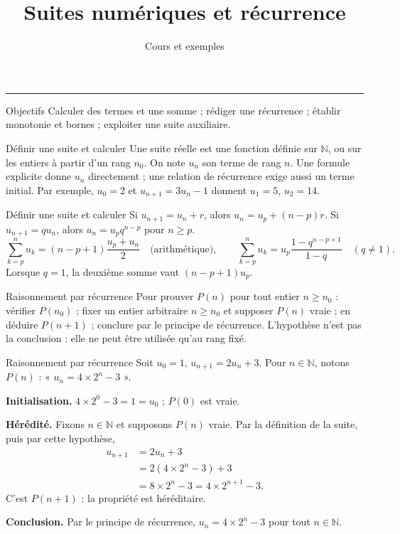 \documentclass[aspectratio=169,10pt]{beamer}
\title{Suites numériques et récurrence}
\subtitle{Cours et exemples}
\date{}
\author{}
\providecommand{\N}{\mathbb{N}}
\begin{document}
\begin{frame}[plain]
\vfill
{\inserttitle\par}
\medskip
{\insertsubtitle\par}
\medskip
{\rule{\textwidth}{.5pt}}
\vfill
\end{frame}
\begin{frame}{Objectifs}
Calculer des termes et une somme ; rédiger une récurrence ; établir monotonie et bornes ; exploiter une suite auxiliaire.
\end{frame}
\begin{frame}{Définir une suite et calculer}
Une suite réelle est une fonction définie sur \(\N\), ou sur les entiers à partir d'un rang \(n_0\). On note \(u_n\) son terme de rang \(n\). Une formule explicite donne \(u_n\) directement ; une relation de récurrence exige aussi un terme initial. Par exemple, \(u_0=2\) et \(u_{n+1}=3u_n-1\) donnent \(u_1=5\), \(u_2=14\).
\end{frame}
\begin{frame}{Définir une suite et calculer}
Si \(u_{n+1}=u_n+r\), alors \(u_n=u_p+(n-p)r\). Si \(u_{n+1}=qu_n\), alors \(u_n=u_pq^{n-p}\) pour \(n\ge p\).
\[\sum_{k=p}^n u_k=(n-p+1)\dfrac{u_p+u_n}{2}\quad\text{(arithmétique)},\qquad
\sum_{k=p}^n u_k=u_p\dfrac{1-q^{n-p+1}}{1-q}\quad(q\ne1).\]
Lorsque \(q=1\), la deuxième somme vaut \((n-p+1)u_p\).
\end{frame}
\begin{frame}{Raisonnement par récurrence}
Pour prouver \(P(n)\) pour tout entier \(n\ge n_0\) : vérifier \(P(n_0)\) ; fixer un entier arbitraire \(n\ge n_0\) et supposer \(P(n)\) vraie ; en déduire \(P(n+1)\) ; conclure par le principe de récurrence. L'hypothèse n'est pas la conclusion : elle ne peut être utilisée qu'au rang fixé.
\end{frame}
\begin{frame}{Raisonnement par récurrence}
Soit \(u_0=1\), \(u_{n+1}=2u_n+3\). Pour \(n\in\N\), notons \(P(n)\) : « \(u_n=4\times2^n-3\) ».

\textbf{Initialisation.} \(4\times2^0-3=1=u_0\) ; \(P(0)\) est vraie.

\textbf{Hérédité.} Fixons \(n\in\N\) et supposons \(P(n)\) vraie. Par la définition de la suite, puis par cette hypothèse,
\[\begin{aligned}u_{n+1}&=2u_n+3\\&=2(4\times2^n-3)+3\\&=8\times2^n-3=4\times2^{n+1}-3.\end{aligned}\]
C'est \(P(n+1)\) : la propriété est héréditaire.

\textbf{Conclusion.} Par le principe de récurrence, \(u_n=4\times2^n-3\) pour tout \(n\in\N\).
\end{frame}
\end{document}
